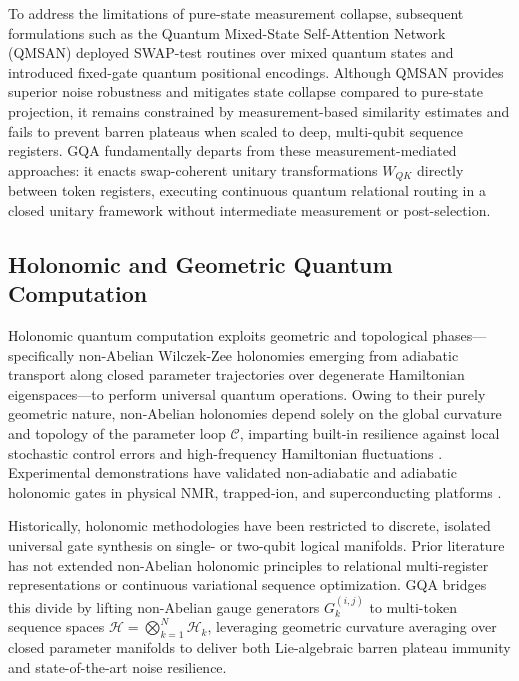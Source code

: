 \documentclass{article}
\begin{document}
To address the limitations of pure-state measurement collapse, subsequent formulations such as the Quantum Mixed-State Self-Attention Network (QMSAN) \citep{Chen2024QuantumMixedstate} deployed SWAP-test routines over mixed quantum states and introduced fixed-gate quantum positional encodings. Although QMSAN provides superior noise robustness and mitigates state collapse compared to pure-state projection, it remains constrained by measurement-based similarity estimates and fails to prevent barren plateaus when scaled to deep, multi-qubit sequence registers. GQA fundamentally departs from these measurement-mediated approaches: it enacts swap-coherent unitary transformations $W_{QK}$ directly between token registers, executing continuous quantum relational routing in a closed unitary framework without intermediate measurement or post-selection.

\subsection{Holonomic and Geometric Quantum Computation}
\label{sec:rel_holonomic}

Holonomic quantum computation exploits geometric and topological phases—specifically non-Abelian Wilczek-Zee holonomies emerging from adiabatic transport along closed parameter trajectories over degenerate Hamiltonian eigenspaces—to perform universal quantum operations. Owing to their purely geometric nature, non-Abelian holonomies depend solely on the global curvature and topology of the parameter loop $\mathcal{C}$, imparting built-in resilience against local stochastic control errors and high-frequency Hamiltonian fluctuations \citep{Feng2013ExperimentalRealization}. Experimental demonstrations have validated non-adiabatic and adiabatic holonomic gates in physical NMR, trapped-ion, and superconducting platforms \citep{Feng2013ExperimentalRealization}.

Historically, holonomic methodologies have been restricted to discrete, isolated universal gate synthesis on single- or two-qubit logical manifolds. Prior literature has not extended non-Abelian holonomic principles to relational multi-register representations or continuous variational sequence optimization. GQA bridges this divide by lifting non-Abelian gauge generators $G_k^{(i, j)}$ to multi-token sequence spaces $\mathcal{H} = \bigotimes_{k=1}^N \mathcal{H}_k$, leveraging geometric curvature averaging over closed parameter manifolds to deliver both Lie-algebraic barren plateau immunity and state-of-the-art noise resilience.
\end{document}
